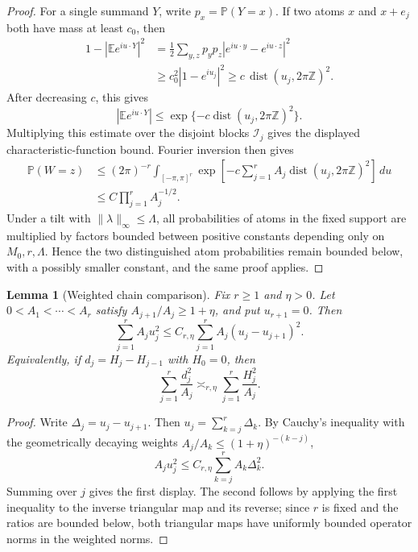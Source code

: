 \documentclass[11pt]{article}
\newtheorem{lemma}[theorem]{Lemma}
\theoremstyle{remark}
\newcommand{\Pp}{\mathbb P}
\newcommand{\Ee}{\mathbb E}
\newcommand{\dd}{\,d}
\begin{document}
\begin{proof}
For a single summand \(Y\), write \(p_x=\Pp(Y=x)\).  If two atoms
\(x\) and \(x+e_j\) both have mass at least \(c_0\), then
\[
\begin{aligned}
        1-|\Ee e^{iu\cdot Y}|^2
        &=\frac12\sum_{y,z}p_yp_z
        |e^{iu\cdot y}-e^{iu\cdot z}|^2  \\
        &\ge c_0^2 |1-e^{iu_j}|^2
        \ge c\,\operatorname{dist}(u_j,2\pi\mathbb Z)^2 .
\end{aligned}
\]
After decreasing \(c\), this gives
\[
        |\Ee e^{iu\cdot Y}|
        \le \exp\{-c\operatorname{dist}(u_j,2\pi\mathbb Z)^2\}.
\]
Multiplying this estimate over the disjoint blocks \(\mathcal I_j\) gives the displayed characteristic-function bound.  Fourier inversion then gives
\[
\begin{aligned}
        \Pp(W=z)
        &\le (2\pi)^{-r}\int_{[-\pi,\pi]^r}
        \exp\left[-c\sum_{j=1}^r
        A_j\operatorname{dist}(u_j,2\pi\mathbb Z)^2\right]\dd u \\
        &\le C\prod_{j=1}^r A_j^{-1/2}.
\end{aligned}
\]
Under a tilt with \(\|\lambda\|_\infty\le\Lambda\), all probabilities of atoms in the fixed support are multiplied by factors bounded between positive constants depending only on \(M_0,r,\Lambda\).  Hence the two distinguished atom probabilities remain bounded below, with a possibly smaller constant, and the same proof applies.
\end{proof}

\begin{lemma}[Weighted chain comparison]\label{lem:weighted-chain-comparison}
Fix $r\ge1$ and $\eta>0$.  Let
$0<A_1<\cdots<A_r$ satisfy $A_{j+1}/A_j\ge1+\eta$, and put
$u_{r+1}=0$.  Then
\[
        \sum_{j=1}^r A_j u_j^2
        \le C_{r,\eta}\sum_{j=1}^r A_j(u_j-u_{j+1})^2 .
\]
Equivalently, if $d_j=H_j-H_{j-1}$ with $H_0=0$, then
\[
        \sum_{j=1}^r \frac{d_j^2}{A_j}
        \asymp_{r,\eta}
        \sum_{j=1}^r \frac{H_j^2}{A_j} .
\]
\end{lemma}

\begin{proof}
Write $\Delta_j=u_j-u_{j+1}$.  Then $u_j=\sum_{k=j}^r\Delta_k$.  By Cauchy's inequality with the geometrically decaying weights $A_j/A_k\le(1+\eta)^{-(k-j)}$,
\[
        A_j u_j^2
        \le C_{r,\eta}\sum_{k=j}^r A_k\Delta_k^2 .
\]
Summing over $j$ gives the first display.  The second follows by applying the first inequality to the inverse triangular map and its reverse; since $r$ is fixed and the ratios are bounded below, both triangular maps have uniformly bounded operator norms in the weighted norms.
\end{proof}
\end{document}
